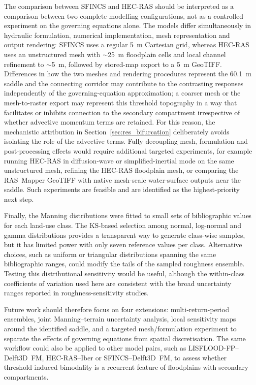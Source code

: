 \documentclass[a4paper,fleqn]{cas-sc}
\newcommand{\sfincs}{\textsc{SFINCS}}
\newcommand{\hecras}{\textsc{HEC-RAS}}
\begin{document}
The comparison between \sfincs{} and \hecras{} should be interpreted as a comparison between two complete modelling configurations, not as a controlled experiment on the governing equations alone. The models differ simultaneously in hydraulic formulation, numerical implementation, mesh representation and output rendering: \sfincs{} uses a regular 5~m Cartesian grid, whereas \hecras{} uses an unstructured mesh with $\sim$25~m floodplain cells and local channel refinement to $\sim$5~m, followed by stored-map export to a 5~m GeoTIFF. Differences in how the two meshes and rendering procedures represent the 60.1~m saddle and the connecting corridor may contribute to the contrasting responses independently of the governing-equation approximation; a coarser mesh or the mesh-to-raster export may represent this threshold topography in a way that facilitates or inhibits connection to the secondary compartment irrespective of whether advective momentum terms are retained. For this reason, the mechanistic attribution in Section~\ref{sec:res_bifurcation} deliberately avoids isolating the role of the advective terms. Fully decoupling mesh, formulation and post-processing effects would require additional targeted experiments, for example running \hecras{} in diffusion-wave or simplified-inertial mode on the same unstructured mesh, refining the \hecras{} floodplain mesh, or comparing the RAS~Mapper GeoTIFF with native mesh-scale water-surface outputs near the saddle. Such experiments are feasible and are identified as the highest-priority next step.

Finally, the Manning distributions were fitted to small sets of bibliographic values for each land-use class. The KS-based selection among normal, log-normal and gamma distributions provides a transparent way to generate class-wise samples, but it has limited power with only seven reference values per class. Alternative choices, such as uniform or triangular distributions spanning the same bibliographic ranges, could modify the tails of the sampled roughness ensemble. Testing this distributional sensitivity would be useful, although the within-class coefficients of variation used here are consistent with the broad uncertainty ranges reported in roughness-sensitivity
studies.

Future work should therefore focus on four extensions: multi-return-period ensembles, joint Manning--terrain uncertainty analysis, local sensitivity maps around the identified saddle, and a targeted mesh/formulation experiment to separate the effects of governing equations from spatial discretisation. The same workflow could also be applied to other model pairs, such as LISFLOOD-FP--Delft3D~FM, \hecras{}--Iber or \sfincs{}--Delft3D~FM, to assess whether threshold-induced bimodality is a recurrent feature of floodplains with secondary compartments.
\end{document}
